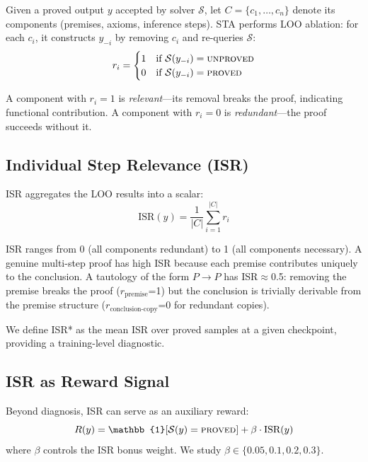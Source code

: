 \documentclass[11pt]{article}
\begin{document}
Given a proved output $y$ accepted by solver $\mathcal{S}$, let $C = \{c_1, \ldots, c_n\}$ denote its components (premises, axioms, inference steps). STA performs LOO ablation: for each $c_i$, it constructs $y_{-i}$ by removing $c_i$ and re-queries $\mathcal{S}$:
\begin{equation}
r_i = \begin{cases} 1 & \text{if } \mathcal{S}(y_{-i}) = \textsc{unproved} \\ 0 & \text{if } \mathcal{S}(y_{-i}) = \textsc{proved} \end{cases}
\end{equation}

A component with $r_i = 1$ is \emph{relevant}---its removal breaks the proof, indicating functional contribution. A component with $r_i = 0$ is \emph{redundant}---the proof succeeds without it.

\subsection{Individual Step Relevance (ISR)}

ISR aggregates the LOO results into a scalar:
\begin{equation}
\text{ISR}(y) = \frac{1}{|C|} \sum_{i=1}^{|C|} r_i
\end{equation}

ISR ranges from 0 (all components redundant) to 1 (all components necessary). A genuine multi-step proof has high ISR because each premise contributes uniquely to the conclusion. A tautology of the form $P \to P$ has ISR$\approx$0.5: removing the premise breaks the proof ($r_{\text{premise}}$=1) but the conclusion is trivially derivable from the premise structure ($r_{\text{conclusion-copy}}$=0 for redundant copies).

We define ISR* as the mean ISR over proved samples at a given checkpoint, providing a training-level diagnostic.

\subsection{ISR as Reward Signal}

Beyond diagnosis, ISR can serve as an auxiliary reward:
\begin{equation}
R(y) = \mathbb{1}[\mathcal{S}(y) = \textsc{proved}] + \beta \cdot \text{ISR}(y)
\end{equation}
where $\beta$ controls the ISR bonus weight. We study $\beta \in \{0.05, 0.1, 0.2, 0.3\}$.
\end{document}
